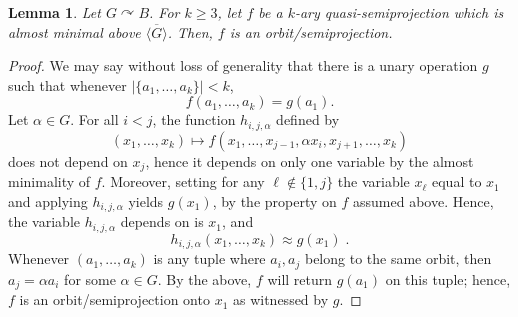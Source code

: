 \documentclass{article}
\newtheorem{lemma}[theorem]{Lemma}
\theoremstyle{remark}
\theoremstyle{definition}
\def\acts{\curvearrowright}
\begin{document}
\begin{lemma}\label{semiorb} Let $G\acts B$. For $k\geq 3$, let $f$ be a $k$-ary quasi-semiprojection which is almost minimal above $\overline{\langle G \rangle}$. Then, $f$ is an orbit\-/semiprojection.
\end{lemma}
\begin{proof}
We may say without loss of generality that there is a unary operation $g$ such that whenever $|\{a_1, \dots, a_k\}|<k$, 
\[f(a_1, \dots, a_k)=g(a_1).\]
Let $\alpha\in G$. For all $i<j$, the function $h_{i,j, \alpha}$ defined by 
\[
(x_1,\ldots,x_k)\mapsto f(x_1,\ldots,x_{j-1},\alpha x_i,x_{j+1},\ldots,x_k)
\]
does not depend on $x_j$, hence it depends on only one variable by the almost minimality of $f$. Moreover,  setting for any $\ell\notin\{ 1,j\}$ the variable $x_\ell$  equal to $x_1$ and applying  $h_{i,j,\alpha}$ yields $g(x_1)$, by the property on $f$ assumed above. Hence, the variable $h_{i,j,\alpha}$ depends on is $x_1$, and 
\[
h_{i,j,\alpha}(x_1,\ldots,x_k)\approx g(x_1)\; .
\]
 Whenever $(a_1,\ldots,a_k)$ is any tuple where $a_i, a_j$ belong to the same orbit, then $a_j=\alpha a_i$ for some $\alpha \in G$. By the above, $f$ will return $g(a_1)$ on this tuple; hence, $f$ is an orbit\-/semiprojection onto $x_1$ as witnessed by $g$.
\end{proof}
\end{document}
